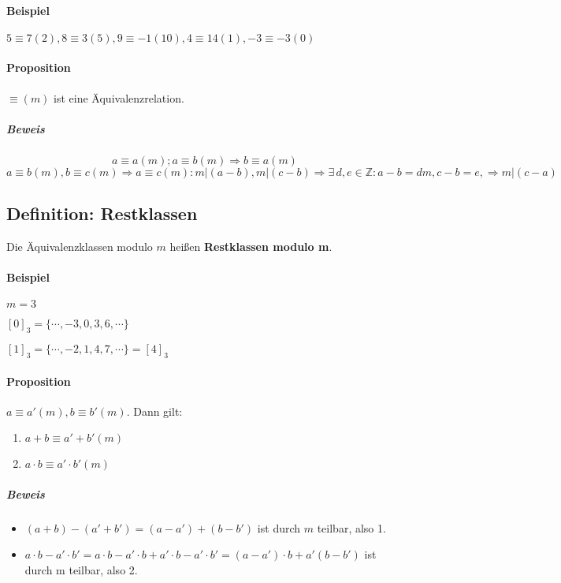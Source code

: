 \documentclass[14pt,a4paper]{article}
\newcommand{\Z}{\ensuremath{\mathbb{Z}}}
\begin{document}
  \paragraph{Beispiel}
  $5 \equiv 7 (2), 8 \equiv 3 (5), 9 \equiv -1 (10), 4 \equiv 14 (1), -3 \equiv -3 (0)$

  \paragraph{Proposition}
  $ \equiv (m) $ ist eine Äquivalenzrelation.

  \subparagraph{Beweis}
  $$ a \equiv a (m) ; a \equiv b (m) \Rightarrow b \equiv a (m)$$
  $$a \equiv b (m), b \equiv c (m) \Rightarrow a \equiv c (m) : m | (a-b), m|
  (c-b) \Rightarrow \exists \, d,e \in \Z : a-b = dm, c-b=e, \Rightarrow
  m|(c-a)$$

  \subsection{Definition: Restklassen}
  Die Äquivalenzklassen modulo $m$ heißen \textbf{Restklassen modulo m}.

  \paragraph{Beispiel}
  $ m = 3 $

  $ [0]_3 = \{ \dotsb, -3, 0, 3, 6, \dotsb \} $ \par
  $ [1]_3 = \{ \dotsb, -2, 1, 4, 7, \dotsb \} = [4]_3 $

  \paragraph{Proposition}
  $ a \equiv a' (m), b \equiv b' (m)$.
  Dann gilt:
  \begin{enumerate}
    \item $ a + b \equiv a' + b' (m) $
    \item $a \cdot b \equiv a' \cdot b' (m) $
  \end{enumerate}

  \subparagraph{Beweis}
  \begin{itemize}
    \item $ (a+b) - (a' + b') = (a - a') + (b - b')$ ist durch $m$ teilbar, also 1.
    \item $ a \cdot b - a' \cdot b' = a \cdot b - a' \cdot b + a'\cdot b - a'
      \cdot b' = (a - a') \cdot b + a'(b - b') $ ist durch m teilbar, also 2.
  \end{itemize}
\end{document}

